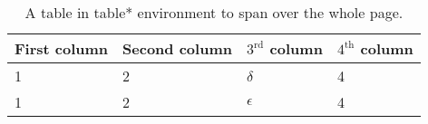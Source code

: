\begin{table*}[tpb]
    \centering
    \begin{tabular}{p{2cm} p{2cm} p{2cm} p{2cm}}
        \toprule
        First column & Second column & $\mathrm{3^{rd}}$ column & $\mathrm{4^{th}}$ column
        \tabularnewline\midrule
        1 & 2 & $\delta$   & 4
        \tabularnewline
        1 & 2 & $\epsilon$ & 4
        \tabularnewline\bottomrule
    \end{tabular}
    \caption{A table in table* environment to span over the whole page.}
    \label{tab:table5}
\end{table*}
